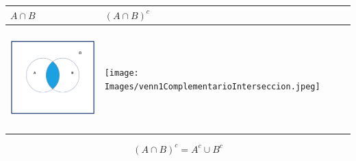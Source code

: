 \documentclass[
  letterpaper,
  DIV=11,
  numbers=noendperiod]{scrreprt}
\begin{document}
\begin{longtable}[]{@{}
  >{\centering\arraybackslash}p{}
  >{\centering\arraybackslash}p{}@{}}
\toprule\noalign{}
\begin{minipage}[b]{\linewidth}\centering
\(A\cap B\)
\end{minipage} & \begin{minipage}[b]{\linewidth}\centering
\((A\cap B)^c\)
\end{minipage} \\
\midrule\noalign{}
\endhead
\bottomrule\noalign{}
\endlastfoot
\includegraphics[width=\linewidth,height=1.5625in,keepaspectratio]{Images/venn1AyB.jpeg}
&
\texttt{[image: Images/venn1ComplementarioInterseccion.jpeg]} \\
\end{longtable}

\[(A\cap B)^c=A^c\cup B^c\]
\end{document}
